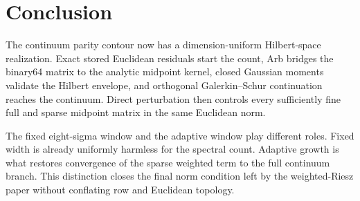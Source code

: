 \documentclass[11pt]{article}
\theoremstyle{definition}
\theoremstyle{remark}
\begin{document}
\section{Conclusion}

The continuum parity contour now has a dimension-uniform Hilbert-space
realization.  Exact stored Euclidean residuals start the count, Arb bridges
the binary64 matrix to the analytic midpoint kernel, closed Gaussian moments
validate the Hilbert envelope, and orthogonal Galerkin--Schur continuation
reaches the continuum.  Direct perturbation then controls every sufficiently
fine full and sparse midpoint matrix in the same Euclidean norm.

The fixed eight-sigma window and the adaptive window play different roles.
Fixed width is already uniformly harmless for the spectral count.  Adaptive
growth is what restores convergence of the sparse weighted term to the full
continuum branch.  This distinction closes the final norm condition left by
the weighted-Riesz paper without conflating row and Euclidean topology.



\end{document}
